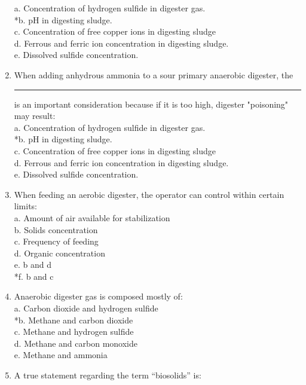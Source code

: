 \documentclass{article}
\begin{document}
\begin{enumerate}
a. Concentration of hydrogen sulfide in digester gas. \\
*b. pH in digesting sludge. \\
c. Concentration of free copper ions in digesting sludge \\
d. Ferrous and ferric ion concentration in digesting sludge. \\
e. Dissolved sulfide concentration. \\

\item  When adding anhydrous ammonia to a sour primary anaerobic digester, the \rule{1.5cm}{0.3mm} is an important consideration because if it is too high, digester "poisoning" may result: \\

a. Concentration of hydrogen sulfide in digester gas. \\
*b. pH in digesting sludge. \\
c. Concentration of free copper ions in digesting sludge \\
d. Ferrous and ferric ion concentration in digesting sludge. \\
e. Dissolved sulfide concentration. \\

\item  When feeding an aerobic digester, the operator can control within certain limits: \\

a. Amount of air available for stabilization \\
b. Solids concentration \\
c. Frequency of feeding \\
d. Organic concentration \\
e. b and d \\
*f. b and c \\

\item  Anaerobic digester gas is composed mostly of: \\

a. Carbon dioxide and hydrogen sulfide \\
*b. Methane and carbon dioxide \\
c. Methane and hydrogen sulfide \\
d. Methane and carbon monoxide \\
e. Methane and ammonia \\

\item  A true statement regarding the term “biosolids” is: \\


\end{enumerate}
\end{document}
